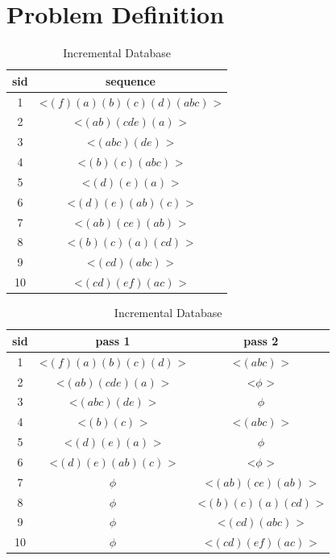 \section{Problem Definition} \label{problem_definition}

\begin{table}[!htb]
\parbox{.35\linewidth}{
\centering
\begin{tabular}{|c|c|}
\hline
sid & sequence\\
\hline
1 & \textless $(f)(a)(b)(c)(d)(abc)$ \textgreater\\
\hline
2 & \textless $(ab)(cde)(a)$ \textgreater \\
\hline
3 & \textless $(abc)(de)$ \textgreater \\
\hline
4 & \textless $(b)(c)(abc)$ \textgreater \\
\hline
5 & \textless $(d)(e)(a)$ \textgreater \\
\hline
6 & \textless $(d)(e)(ab)(c)$ \textgreater \\
\hline
7 & \textless $(ab)(ce)(ab)$ \textgreater\\
\hline
8 & \textless $(b)(c)(a)(cd)$ \textgreater\\
\hline
9 & \textless $(cd)(abc)$ \textgreater \\
\hline
10 & \textless $(cd)(ef)(ac)$ \textgreater \\
\hline
\end{tabular}
\caption{Static Database} \label{table:static_database}
}
\hfill
\parbox{.65\linewidth}{
\centering
\begin{tabular}{|c|c|c|}
\hline
sid & pass 1 & pass 2\\
\hline
1 & \textless $(f)(a)(b)(c)(d)$ \textgreater & \textless $(abc)$ \textgreater\\
\hline
2 & \textless $(ab)(cde)(a)$ \textgreater & \textless $\phi$ \textgreater \\
\hline
3 & \textless $(abc)(de)$ \textgreater & $\phi$ \\
\hline
4 & \textless $(b)(c)$ \textgreater & \textless $(abc)$ \textgreater \\
\hline
5 & \textless $(d)(e)(a)$ \textgreater & $\phi$\\
\hline
6 & \textless $(d)(e)(ab)(c)$ \textgreater & \textless $\phi$ \textgreater\\
\hline
7 & $\phi$ & \textless $(ab)(ce)(ab)$ \textgreater\\
\hline
8 & $\phi$ & \textless $(b)(c)(a)(cd)$ \textgreater\\
\hline
9 & $\phi$ & \textless $(cd)(abc)$ \textgreater \\
\hline
10 & $\phi$ & \textless $(cd)(ef)(ac)$ \textgreater \\
\hline
\end{tabular}
\caption{Incremental Database} \label{table:incremental_database}
}
\end{table}

